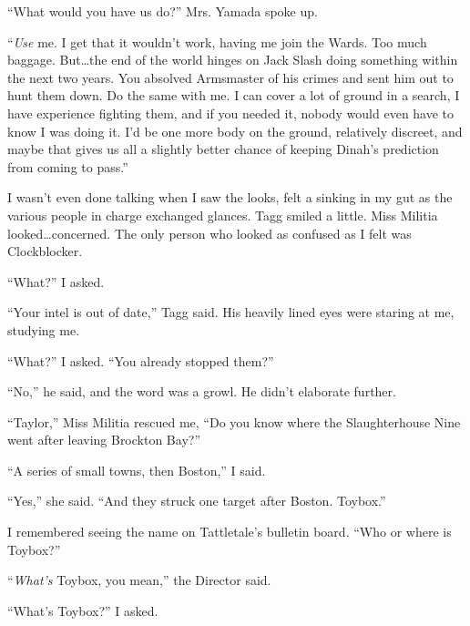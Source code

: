 ``What would you have us do?'' Mrs. Yamada spoke up.



``\emph{Use} me.  I get that it wouldn't work, having me join the Wards.  Too much baggage.  But\ldots the end of the world hinges on Jack Slash doing something within the next two years.  You absolved Armsmaster of his crimes and sent him out to hunt them down.  Do the same with me.  I can cover a lot of ground in a search, I have experience fighting them, and if you needed it, nobody would even have to know I was doing it.  I'd be one more body on the ground, relatively discreet, and maybe that gives us all a slightly better chance of keeping Dinah's prediction from coming to pass.''



I wasn't even done talking when I saw the looks, felt a sinking in my gut as the various people in charge exchanged glances.  Tagg smiled a little.  Miss Militia looked\ldots concerned.  The only person who looked as confused as I felt was Clockblocker.



``What?'' I asked.



``Your intel is out of date,'' Tagg said.  His heavily lined eyes were staring at me, studying me.



``What?'' I asked.  ``You already stopped them?''



``No,'' he said, and the word was a growl.  He didn't elaborate further.



``Taylor,'' Miss Militia rescued me, ``Do you know where the Slaughterhouse Nine went after leaving Brockton Bay?''



``A series of small towns, then Boston,'' I said.



``Yes,'' she said.  ``And they struck one target after Boston.  Toybox.''



I remembered seeing the name on Tattletale's bulletin board.  ``Who or where is Toybox?''



``\emph{What's} Toybox, you mean,'' the Director said.



``What's Toybox?'' I asked.



